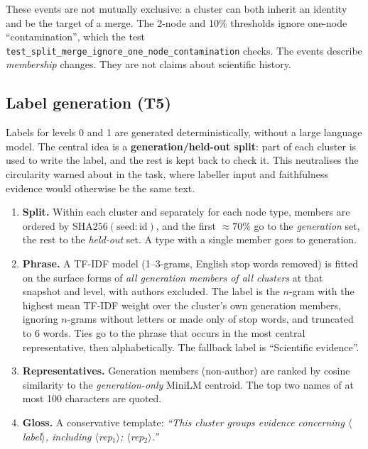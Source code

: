\documentclass[11pt,a4paper]{article}
\theoremstyle{remark}
\newcommand{\code}[1]{\texttt{\small #1}}
\begin{document}
These events are not mutually exclusive: a cluster can both inherit an identity and
be the target of a merge. The 2-node and 10\% thresholds ignore one-node
``contamination'', which the test \code{test\_split\_merge\_ignore\_one\_node\_contamination}
checks. The events describe \emph{membership} changes. They are not claims about
scientific history.

\subsection{Label generation (T5)}
\label{sec:labels}

Labels for levels 0 and 1 are generated deterministically, without a large language
model. The central idea is a \textbf{generation/held-out split}: part of each cluster is
used to write the label, and the rest is kept back to check it. This neutralises the
circularity warned about in the task, where labeller input and faithfulness evidence
would otherwise be the same text.

\begin{enumerate}
  \item \textbf{Split.} Within each cluster and separately for each node type,
        members are ordered by $\mathrm{SHA256}(\text{seed}:\text{id})$, and the first
        $\approx70\%$ go to the \emph{generation} set, the rest to the \emph{held-out}
        set. A type with a single member goes to generation.
  \item \textbf{Phrase.} A TF-IDF model (1--3-grams, English stop words removed) is
        fitted on the surface forms of \emph{all generation members of all clusters} at
        that snapshot and level, with authors excluded. The label is the $n$-gram with
        the highest mean TF-IDF weight over the cluster's own generation members,
        ignoring $n$-grams without letters or made only of stop words, and truncated to
        6 words. Ties go to the phrase that occurs in the most central representative,
        then alphabetically. The fallback label is ``Scientific evidence''.
  \item \textbf{Representatives.} Generation members (non-author) are ranked by cosine
        similarity to the \emph{generation-only} MiniLM centroid. The top two names of
        at most 100 characters are quoted.
  \item \textbf{Gloss.} A conservative template:
        \emph{``This cluster groups evidence concerning $\langle$label$\rangle$,
        including $\langle$rep$_1\rangle$; $\langle$rep$_2\rangle$.''}
\end{enumerate}
\end{document}
